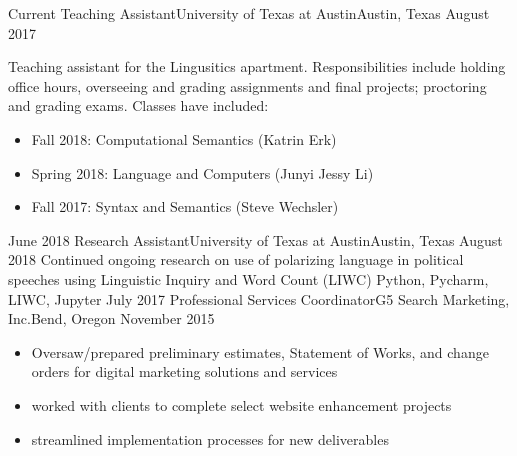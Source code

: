 %
%
%
\begin{experiences}
  \experience
    {Current}   {Teaching Assistant}{University of Texas at Austin}{Austin, Texas}
    {August 2017} { Teaching assistant for the Lingusitics apartment. Responsibilities include holding office hours, overseeing and grading assignments and final projects; proctoring and grading exams. Classes have included:
                      \begin{itemize}
                        \item Fall 2018: Computational Semantics (Katrin Erk) 
                        \item Spring 2018: Language and Computers (Junyi Jessy Li)
                        \item Fall 2017: Syntax and Semantics (Steve Wechsler)
                      \end{itemize}
                    }
  \emptySeparator
  \experiencetech
    {June 2018} {Research Assistant}{University of Texas at Austin}{Austin, Texas}
    {August 2018}    { Continued ongoing research on use of polarizing language in political speeches using Linguistic Inquiry and Word Count (LIWC)  }
                    {Python, Pycharm, LIWC, Jupyter}
  \emptySeparator
  \experiencetech
    {July 2017}     {Professional Services Coordinator}{G5 Search Marketing, Inc.}{Bend, Oregon}
    {November 2015}    {
                      \begin{itemize}
                        \item Oversaw/prepared preliminary estimates, Statement of Works, and change orders for digital marketing solutions and services 
                        \item worked with clients to  complete select website enhancement projects 
                        \item streamlined implementation processes for new deliverables


\end{itemize}}
\end{experiences}
